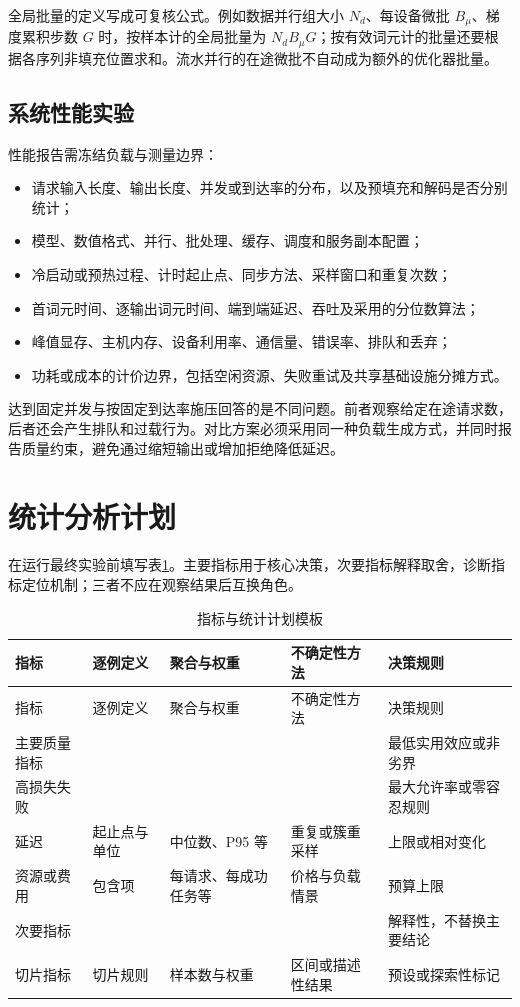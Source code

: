 \documentclass[../workbook.tex]{subfiles}
\begin{document}
全局批量的定义写成可复核公式。例如数据并行组大小 $N_d$、每设备微批 $B_\mu$、梯度累积步数 $G$ 时，按样本计的全局批量为 $N_dB_\mu G$；按有效词元计的批量还要根据各序列非填充位置求和。流水并行的在途微批不自动成为额外的优化器批量。

\subsection{系统性能实验}

性能报告需冻结负载与测量边界：
\begin{itemize}
 \item 请求输入长度、输出长度、并发或到达率的分布，以及预填充和解码是否分别统计；
 \item 模型、数值格式、并行、批处理、缓存、调度和服务副本配置；
 \item 冷启动或预热过程、计时起止点、同步方法、采样窗口和重复次数；
 \item 首词元时间、逐输出词元时间、端到端延迟、吞吐及采用的分位数算法；
 \item 峰值显存、主机内存、设备利用率、通信量、错误率、排队和丢弃；
 \item 功耗或成本的计价边界，包括空闲资源、失败重试及共享基础设施分摊方式。
\end{itemize}

达到固定并发与按固定到达率施压回答的是不同问题。前者观察给定在途请求数，后者还会产生排队和过载行为。对比方案必须采用同一种负载生成方式，并同时报告质量约束，避免通过缩短输出或增加拒绝降低延迟。

\section{统计分析计划}

在运行最终实验前填写表\ref{tab:appendix-metric-plan}。主要指标用于核心决策，次要指标解释取舍，诊断指标定位机制；三者不应在观察结果后互换角色。

\begin{longtable}{@{}p{.15\linewidth}p{.17\linewidth}p{.17\linewidth}p{.17\linewidth}p{.21\linewidth}@{}}
\caption{指标与统计计划模板}\label{tab:appendix-metric-plan}\\
\toprule
指标 & 逐例定义 & 聚合与权重 & 不确定性方法 & 决策规则\\\midrule
\endfirsthead
\toprule
指标 & 逐例定义 & 聚合与权重 & 不确定性方法 & 决策规则\\\midrule
\endhead
主要质量指标 &  &  &  & 最低实用效应或非劣界\\
高损失失败 &  &  &  & 最大允许率或零容忍规则\\
延迟 & 起止点与单位 & 中位数、P95 等 & 重复或簇重采样 & 上限或相对变化\\
资源或费用 & 包含项 & 每请求、每成功任务等 & 价格与负载情景 & 预算上限\\
次要指标 &  &  &  & 解释性，不替换主要结论\\
切片指标 & 切片规则 & 样本数与权重 & 区间或描述性结果 & 预设或探索性标记\\
\bottomrule
\end{longtable}
\end{document}
